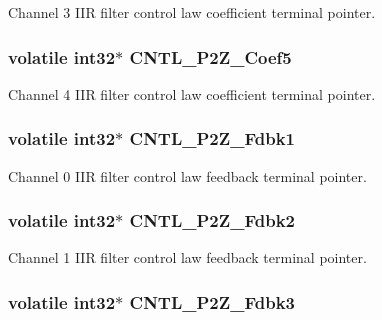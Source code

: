 Channel 3 I\-I\-R filter control law coefficient terminal pointer. \hypertarget{a00010_a5fe3f4dd6aac27512c9e0b6fc843b0b6}{
\subsubsection[{C\-N\-T\-L\-\_\-2\-P2\-Z\-\_\-\-Coef5}]{\setlength{\rightskip}{0pt plus 5cm}volatile int32$\ast$ C\-N\-T\-L\-\_\-P2\-Z\-\_\-\-Coef5}}\label{a00010_a5fe3f4dd6aac27512c9e0b6fc843b0b6}
Channel 4 I\-I\-R filter control law coefficient terminal pointer. \hypertarget{a00010_a9c0418a780375035750c3d4dc16f3ae4}{
\subsubsection[{C\-N\-T\-L\-\_\-2\-P2\-Z\-\_\-\-Fdbk1}]{\setlength{\rightskip}{0pt plus 5cm}volatile int32$\ast$ C\-N\-T\-L\-\_\-P2\-Z\-\_\-\-Fdbk1}}\label{a00010_a9c0418a780375035750c3d4dc16f3ae4}
Channel 0 I\-I\-R filter control law feedback terminal pointer. \hypertarget{a00010_a6092ef1c1c54802bb5e11564f782390d}{
\subsubsection[{C\-N\-T\-L\-\_\-2\-P2\-Z\-\_\-\-Fdbk2}]{\setlength{\rightskip}{0pt plus 5cm}volatile int32$\ast$ C\-N\-T\-L\-\_\-P2\-Z\-\_\-\-Fdbk2}}\label{a00010_a6092ef1c1c54802bb5e11564f782390d}
Channel 1 I\-I\-R filter control law feedback terminal pointer. \hypertarget{a00010_a939782d23ddbf7f45e5e393a65bafcff}{
\subsubsection[{C\-N\-T\-L\-\_\-2\-P2\-Z\-\_\-\-Fdbk3}]{\setlength{\rightskip}{0pt plus 5cm}volatile int32$\ast$ C\-N\-T\-L\-\_\-P2\-Z\-\_\-\-Fdbk3}}\label{a00010_a939782d23ddbf7f45e5e393a65bafcff}
